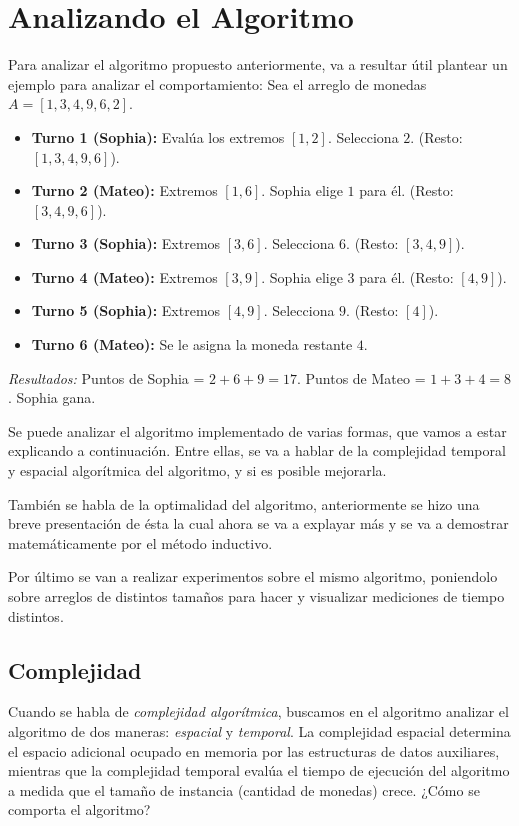 \section{Analizando el Algoritmo}

Para analizar el algoritmo propuesto anteriormente, va a resultar útil plantear un ejemplo para analizar el comportamiento:
Sea el arreglo de monedas $A = [1, 3, 4, 9, 6, 2]$.
\begin{itemize}
    \item \textbf{Turno 1 (Sophia):} Evalúa los extremos $[1, 2]$. Selecciona $2$. (Resto: $[1, 3, 4, 9, 6]$).
    \item \textbf{Turno 2 (Mateo):} Extremos $[1, 6]$. Sophia elige $1$ para él. (Resto: $[3, 4, 9, 6]$).
    \item \textbf{Turno 3 (Sophia):} Extremos $[3, 6]$. Selecciona $6$. (Resto: $[3, 4, 9]$).
    \item \textbf{Turno 4 (Mateo):} Extremos $[3, 9]$. Sophia elige $3$ para él. (Resto: $[4, 9]$).
    \item \textbf{Turno 5 (Sophia):} Extremos $[4, 9]$. Selecciona $9$. (Resto: $[4]$).
    \item \textbf{Turno 6 (Mateo):} Se le asigna la moneda restante $4$.
\end{itemize}
\textit{Resultados:} Puntos de Sophia = $2 + 6 + 9 = 17$. Puntos de Mateo = $1 + 3 + 4 = 8$. Sophia gana.


Se puede analizar el algoritmo implementado de varias formas, que vamos a estar explicando a continuación. Entre ellas, se va a hablar de la complejidad temporal y espacial algorítmica del algoritmo, y si es posible mejorarla.

También se habla de la optimalidad del algoritmo, anteriormente se hizo una breve presentación de ésta la cual ahora se va a explayar más y se va a demostrar matemáticamente por el método inductivo.

Por último se van a realizar experimentos sobre el mismo algoritmo, poniendolo sobre arreglos de distintos tamaños para hacer y visualizar mediciones de tiempo distintos.


\subsection{Complejidad}

Cuando se habla de \textit{complejidad algorítmica}, buscamos en el algoritmo analizar el algoritmo de dos maneras: \textit{espacial} y \textit{temporal}. La complejidad espacial determina el espacio adicional ocupado en memoria por las estructuras de datos auxiliares, mientras que la complejidad temporal evalúa el tiempo de ejecución del algoritmo a medida que el tamaño de instancia (cantidad de monedas) crece. ¿Cómo se comporta el algoritmo?

